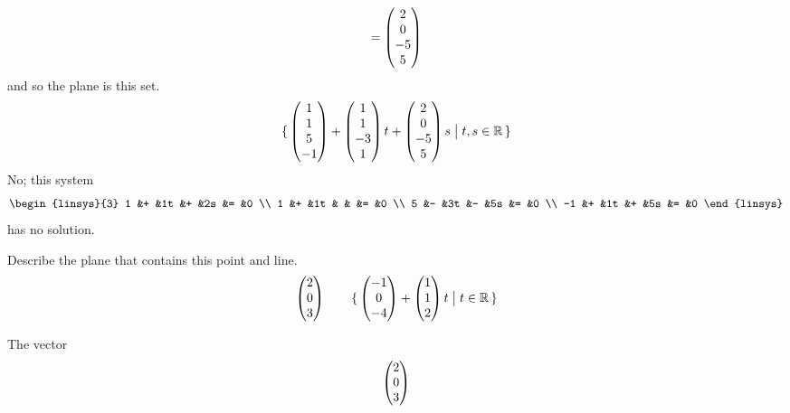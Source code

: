\begin{exercises}
\begin{answer}
\begin{exparts}
\begin{equation*}
            =\begin{pmatrix} 2 \\ 0 \\ -5 \\ 5 \end{pmatrix}
          \end{equation*}
          and so the plane is this set.
          \begin{equation*}
            \mbox{$\{\,\begin{pmatrix} 1 \\ 1 \\ 5 \\ -1 \end{pmatrix}
                 +\begin{pmatrix} 1 \\ 1 \\ -3 \\ 1 \end{pmatrix}t
                 +\begin{pmatrix} 2 \\ 0 \\ -5 \\ 5 \end{pmatrix}s
                \bigm| t,s\in\mathbb{R}\,\}$}
          \end{equation*}
        \partsitem No; this system
          \begin{equation*}
            \begin{linsys}{3}
              1  &+  &1t  &+  &2s  &=  &0  \\
              1  &+  &1t  &   &    &=  &0  \\
              5  &-  &3t  &-  &5s  &=  &0  \\
             -1  &+  &1t  &+  &5s  &=  &0  
            \end{linsys}
          \end{equation*}
          has no solution.
      \end{exparts}  
    \end{answer}
  \item 
    Describe the plane that contains this point and line.
    \begin{equation*}
      \begin{pmatrix} 2 \\ 0 \\ 3 \end{pmatrix}
      \qquad
      \mbox{$\{\,\begin{pmatrix} -1 \\ 0 \\ -4 \end{pmatrix}
           +\begin{pmatrix} 1 \\ 1 \\ 2 \end{pmatrix}t
           \bigm| t\in\mathbb{R}\,\}$}
    \end{equation*}
    \begin{answer}
      The vector
      \begin{equation*}
        \begin{pmatrix} 2 \\ 0 \\ 3 \end{pmatrix}
      \end{equation*}

\end{answer}
\end{exercises}

